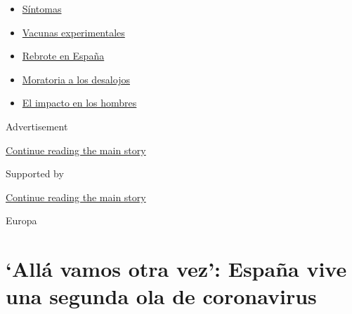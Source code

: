 \begin{itemize}
\tightlist
\item
  \href{https://www.nytimes3xbfgragh.onion/es/interactive/2020/08/06/espanol/ciencia-y-tecnologia/tengo-covid-19-sintomas.html?name=styln-coronavirus-es\&region=TOP_BANNER\&block=storyline_menu_recirc\&action=click\&pgtype=Article\&impression_id=bfd38191-efb5-11ea-9d10-87f4af94003e\&variant=undefined}{Síntomas}
\item
  \href{https://www.nytimes3xbfgragh.onion/es/2020/09/02/espanol/ciencia-y-tecnologia/vacunas-experimentales-coronavirus.html?name=styln-coronavirus-es\&region=TOP_BANNER\&block=storyline_menu_recirc\&action=click\&pgtype=Article\&impression_id=bfd38192-efb5-11ea-9d10-87f4af94003e\&variant=undefined}{Vacunas
  experimentales}
\item
  \href{https://www.nytimes3xbfgragh.onion/es/2020/08/31/espanol/mundo/rebrote-espana.html?name=styln-coronavirus-es\&region=TOP_BANNER\&block=storyline_menu_recirc\&action=click\&pgtype=Article\&impression_id=bfd3a8a0-efb5-11ea-9d10-87f4af94003e\&variant=undefined}{Rebrote
  en España}
\item
  \href{https://www.nytimes3xbfgragh.onion/es/2020/09/02/espanol/negocios/desalojos-trump.html?name=styln-coronavirus-es\&region=TOP_BANNER\&block=storyline_menu_recirc\&action=click\&pgtype=Article\&impression_id=bfd3a8a1-efb5-11ea-9d10-87f4af94003e\&variant=undefined}{Moratoria
  a los desalojos}
\item
  \href{https://www.nytimes3xbfgragh.onion/es/2020/08/26/espanol/ciencia-y-tecnologia/coronavirus-afecta-hombres.html?name=styln-coronavirus-es\&region=TOP_BANNER\&block=storyline_menu_recirc\&action=click\&pgtype=Article\&impression_id=bfd3a8a2-efb5-11ea-9d10-87f4af94003e\&variant=undefined}{El
  impacto en los hombres}
\end{itemize}

Advertisement

\protect\hyperlink{after-top}{Continue reading the main story}

Supported by

\protect\hyperlink{after-sponsor}{Continue reading the main story}

Europa

\hypertarget{alluxe1-vamos-otra-vez-espauxf1a-vive-una-segunda-ola-de-coronavirus}{%
\section{`Allá vamos otra vez': España vive una segunda ola de
coronavirus}\label{alluxe1-vamos-otra-vez-espauxf1a-vive-una-segunda-ola-de-coronavirus}}

